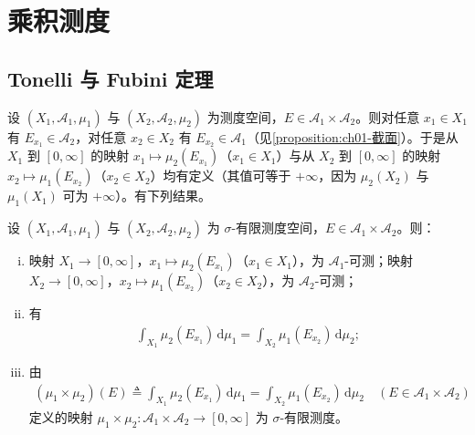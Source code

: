 \documentclass[../../main.tex]{subfiles}%
\begin{document}
\section{乘积测度}\label{section:ch02-乘积测度}

\subsection{Tonelli 与 Fubini 定理}\label{subsection:ch02-TonelliFubini}

设 $(X_1,\mathscr A_1,\mu_1)$ 与 $(X_2,\mathscr A_2,\mu_2)$ 为测度空间，$E\in\mathscr A_1\times\mathscr A_2$。则对任意 $x_1\in X_1$ 有 $E_{x_1}\in\mathscr A_2$，对任意 $x_2\in X_2$ 有 $E_{x_2}\in\mathscr A_1$（见\cref{proposition:ch01-截面}）。于是从 $X_1$ 到 $[0,\infty]$ 的映射 $x_1\mapsto\mu_2(E_{x_1})$（$x_1\in X_1$）与从 $X_2$ 到 $[0,\infty]$ 的映射 $x_2\mapsto\mu_1(E_{x_2})$（$x_2\in X_2$）均有定义（其值可等于 $+\infty$，因为 $\mu_2(X_2)$ 与 $\mu_1(X_1)$ 可为 $+\infty$）。有下列结果。

\begin{proposition}\label{proposition:ch02-乘积截面积分}
设 $(X_1,\mathscr A_1,\mu_1)$ 与 $(X_2,\mathscr A_2,\mu_2)$ 为 $\sigma$-有限测度空间，$E\in\mathscr A_1\times\mathscr A_2$。则：
\begin{enumerate}[(i)]
\item 映射 $X_1\to[0,\infty]$，$x_1\mapsto\mu_2(E_{x_1})$（$x_1\in X_1$），为 $\mathscr A_1$-可测；映射 $X_2\to[0,\infty]$，$x_2\mapsto\mu_1(E_{x_2})$（$x_2\in X_2$），为 $\mathscr A_2$-可测；
\item 有
\begin{align}
\int_{X_1}\mu_2(E_{x_1})\,\mathrm{d}\mu_1=\int_{X_2}\mu_1(E_{x_2})\,\mathrm{d}\mu_2; \label{align:ch02-2.15a}
\end{align}
\item 由
\begin{align}
(\mu_1\times\mu_2)(E)\triangleq\int_{X_1}\mu_2(E_{x_1})\,\mathrm{d}\mu_1=\int_{X_2}\mu_1(E_{x_2})\,\mathrm{d}\mu_2\quad(E\in\mathscr A_1\times\mathscr A_2) \label{align:ch02-2.15b}
\end{align}
定义的映射 $\mu_1\times\mu_2:\mathscr A_1\times\mathscr A_2\to[0,\infty]$ 为 $\sigma$-有限测度。
\end{enumerate}
\end{proposition}
\end{document}
